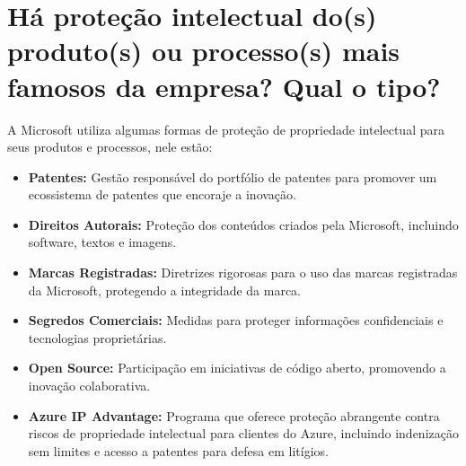 \section{Há proteção intelectual do(s) produto(s) ou processo(s) mais famosos da empresa? Qual o tipo?}

A Microsoft utiliza algumas formas de proteção de propriedade intelectual para seus produtos e processos, nele estão:

\begin{itemize}
    \item \textbf{Patentes:} Gestão responsável do portfólio de patentes para promover um ecossistema de patentes que encoraje a inovação.
    \item \textbf{Direitos Autorais:} Proteção dos conteúdos criados pela Microsoft, incluindo software, textos e imagens.
    \item \textbf{Marcas Registradas:} Diretrizes rigorosas para o uso das marcas registradas da Microsoft, protegendo a integridade da marca.
    \item \textbf{Segredos Comerciais:} Medidas para proteger informações confidenciais e tecnologias proprietárias.
    \item \textbf{Open Source:} Participação em iniciativas de código aberto, promovendo a inovação colaborativa.
    \item \textbf{Azure IP Advantage:} Programa que oferece proteção abrangente contra riscos de propriedade intelectual para clientes do Azure, incluindo indenização sem limites e acesso a patentes para defesa em litígios.
\end{itemize}

